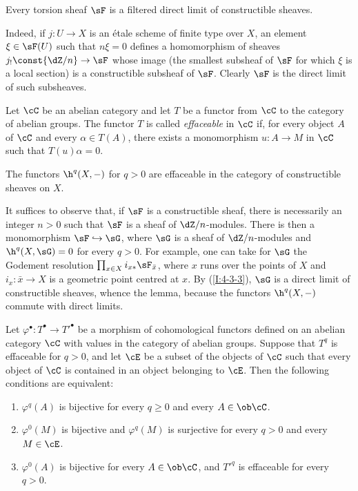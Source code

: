 \documentclass[oneside]{book}
\begin{document}
\begin{lemma}\label{I:4-3-3}
Every torsion sheaf $\sF$ is a filtered direct limit of constructible
sheaves.
\end{lemma}

Indeed, if $j:U\to X$ is an étale scheme of finite type over $X$, an
element $\xi\in\sF(U)$ such that $n\xi=0$ defines a homomorphism of
sheaves $j_!\const{\dZ/n}\to\sF$ whose image (the smallest subsheaf of
$\sF$ for which $\xi$ is a local section) is a constructible subsheaf
of $\sF$. Clearly $\sF$ is the direct limit of such subsheaves.

\begin{definition}\label{I:4-3-4}
Let $\cC$ be an abelian category and let $T$ be a functor from $\cC$ to
the category of abelian groups. The functor $T$ is called
\emph{effaceable} in $\cC$ if, for every object $A$ of $\cC$ and every
$\alpha\in T(A)$, there exists a monomorphism $u:A\to M$ in $\cC$ such
that $T(u)\alpha=0$.
\end{definition}

\begin{lemma}\label{I:4-3-5}
The functors $\h^q(X,-)$ for $q>0$ are effaceable in the category of
constructible sheaves on $X$.
\end{lemma}

It suffices to observe that, if $\sF$ is a constructible sheaf, there is
necessarily an integer $n>0$ such that $\sF$ is a sheaf of
$\dZ/n$-modules. There is then a monomorphism $\sF\hookrightarrow\sG$,
where $\sG$ is a sheaf of $\dZ/n$-modules and
$\h^q(X,\sG)=0$ for every $q>0$. For example, one can take for $\sG$
the Godement resolution $\prod_{x\in X}i_{x*}\sF_{\bar x}$, where $x$
runs over the points of $X$ and $i_x:\bar x\to X$ is a geometric point
centred at $x$. By (\ref{I:4-3-3}), $\sG$ is a direct limit of
constructible sheaves, whence the lemma, because the functors
$\h^q(X,-)$ commute with direct limits.

\begin{lemma}\label{I:4-3-6}
Let $\varphi^\bullet:T^\bullet\to{T'}^\bullet$ be a morphism of
cohomological functors defined on an abelian category $\cC$ with values
in the category of abelian groups. Suppose that $T^q$ is effaceable for
$q>0$, and let $\cE$ be a subset of the objects of $\cC$ such that
every object of $\cC$ is contained in an object belonging to $\cE$.
Then the following conditions are equivalent:
\begin{enumerate}[\indent (i)]
  \item $\varphi^q(A)$ is bijective for every $q\geqslant0$ and every
    $A\in\ob\cC$.
  \item $\varphi^0(M)$ is bijective and $\varphi^q(M)$ is surjective for
    every $q>0$ and every $M\in\cE$.
  \item $\varphi^0(A)$ is bijective for every $A\in\ob\cC$, and
    ${T'}^q$ is effaceable for every $q>0$.
\end{enumerate}
\end{lemma}
\end{document}
